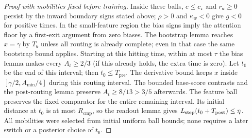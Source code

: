 \begin{proof}[Proof with mobilities fixed before training]
Inside these balls, $c\le c_\star$ and $r_u\ge0$ persist by the inward
boundary signs stated above; $\rho>0$ and $\kappa_w<0$ give $g<0$ for positive
times. In the small-feature region the bias signs imply the attention
floor by a first-exit argument from zero biases. The bootstrap lemma
reaches $x=\gamma$ by $T_b$ unless all routing is already complete;
even in that case the same bootstrap bound applies. Starting at this
hitting time, within at most $\tau$ the bias lemma makes every
$A_t\ge2/3$ (if this already holds, the extra time is zero). Let $t_0$
be the end of this interval; then $t_0\le T_{\mathrm{pre}}$.
The derivative bound keeps $x$ inside $[\gamma/2,A_{\min}/4]$ during
this routing interval. The bounded base-score contrasts and the
post-routing lemma preserve $A_t\ge8/13>3/5$ afterwards.
The feature ball preserves the fixed comparator for the entire remaining
interval. Its initial distance at $t_0$ is at most $R_{\mathrm{cmp}}$, so the readout
lemma gives $L_{\mathrm{step}}(t_0+T_{\mathrm{post}})\le\eta$.
All mobilities were selected from initial uniform ball bounds; none
requires a later switch or a posterior choice of $t_0$.
\end{proof}

